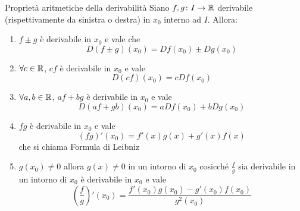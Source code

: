 \documentclass[a4paper]{article}
\begin{document}
\begin{snippetproposition}{Proprietà aritmetiche della derivabilità}
    Siano \(f,g \colon I \to \mathbb{R}\)
    derivabile (rispettivamente da sinistra o destra) in \(x_0\) interno ad \(I\). Allora:
    \begin{enumerate}
        \item \(f\pm g\) è derivabile in \(x_0\) e vale che
        \[
            D(f\pm g)(x_0) = Df(x_0) \pm Dg(x_0)
        \]
        \item \(\forall c\in\mathbb{R}\), \(cf\) è derivabile in \(x_0\)
        e vale
        \[
            D(cf)(x_0) = cDf(x_0)
        \]
        \item \(\forall a,b\in\mathbb{R}\), \(af+bg\) è derivabile in \(x_0\) e vale
        \[
            D(af+gb)(x_0) = aDf(x_0) + bDg(x_0)
        \]
        \item \(fg\) è derivabile in \(x_0\) e vale
        \[
            (fg)'(x_0) = f'(x)g(x) + g'(x)f(x)
        \]
        che si chiama Formula di Leibniz
        \item \(g(x_0) \neq 0\) allora \(g(x) \neq 0\) in un intorno di \(x_0\)
        cosicché \(\frac{f}{g}\) sia derivabile in un intorno di \(x_0\) è derivabile in \(x_0\)
        e vale
        \[
            {(\frac{f}{g})}'(x_0) = \frac{f'(x_0) g(x_0) - g'(x_0)f(x_0)}{g^2(x_0)}
        \]
    \end{enumerate}
\end{snippetproposition}
\end{document}
